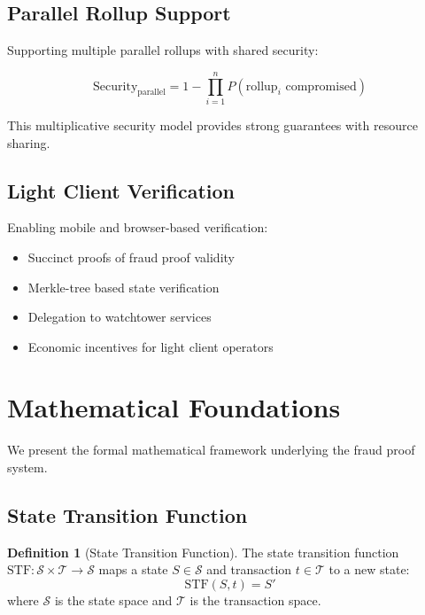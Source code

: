 \documentclass[11pt,a4paper]{article}
\theoremstyle{definition}
\newtheorem{definition}{Definition}[section]
\begin{document}
\subsection{Parallel Rollup Support}

Supporting multiple parallel rollups with shared security:

\begin{equation}
\text{Security}_{\text{parallel}} = 1 - \prod_{i=1}^{n} P(\text{rollup}_i \text{ compromised})
\end{equation}

This multiplicative security model provides strong guarantees with resource sharing.

\subsection{Light Client Verification}

Enabling mobile and browser-based verification:

\begin{itemize}
    \item Succinct proofs of fraud proof validity
    \item Merkle-tree based state verification
    \item Delegation to watchtower services
    \item Economic incentives for light client operators
\end{itemize}

\section{Mathematical Foundations}

We present the formal mathematical framework underlying the fraud proof system.

\subsection{State Transition Function}

\begin{definition}[State Transition Function]
The state transition function $\text{STF}: \mathcal{S} \times \mathcal{T} \rightarrow \mathcal{S}$ maps a state $S \in \mathcal{S}$ and transaction $t \in \mathcal{T}$ to a new state:
\begin{equation}
\text{STF}(S, t) = S'
\end{equation}
where $\mathcal{S}$ is the state space and $\mathcal{T}$ is the transaction space.
\end{definition}
\end{document}
